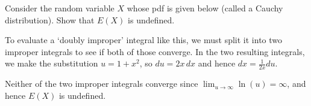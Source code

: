 \begin{examp}Consider the random variable $X$ whose pdf is given below (called a Cauchy distribution). Show that $E(X)$ is undefined.
\vspace{-0.75em}
\begin{center}
    \begin{minipage}{.5\textwidth}
        \centering
{}
\vspace{1.25em}
    \end{minipage}%
    \begin{minipage}{0.5\textwidth}
        \centering
\end{minipage}
\end{center}
\vspace{-0.5em}
\par
\noindent To evaluate a `doubly improper' integral like this, we must split it into two improper integrals to see if both of those converge. In the two resulting integrals, we make the substitution $u = 1+x^2$, so $du = 2x \, dx$ and hence $dx = \frac{1}{2x}du$.
\par
\noindent Neither of the two improper integrals converge since $\lim_{u \to \infty} \ln(u) = \infty$, and hence $E(X)$ is undefined.
\end{examp}

